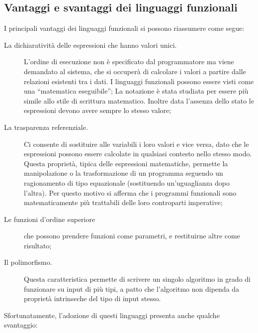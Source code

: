 \subsection{Vantaggi e svantaggi dei linguaggi 
funzionali}
I principali vantaggi dei linguaggi funzionali si possono riassumere come segue:
\begin{description}
    \item[La dichiarativit\`a delle espressioni che hanno valori 
    unici.] L'ordine di esecuzione non \`e specificato dal programmatore ma 
    viene demandato al sistema, che si occuper\`a di calcolare i valori a 
    partire dalle relazioni esistenti tra i dati. I linguaggi funzionali 
    possono essere visti come una ``matematica eseguibile''; La notazione \`e
    stata studiata per essere pi\`u simile allo stile di scrittura 
    matematico. Inoltre data l'assenza dello stato le espressioni devono avere sempre lo stesso valore;

    \item[La trasparenza referenziale.] Ci consente di sostituire alle 
    variabili i loro valori e vice versa, dato che le espressioni possono 
    essere calcolate in qualsiasi contesto nello stesso modo. Questa propriet\`a, tipica delle 
    espressioni matematiche, permette la manipolazione o la trasformazione di 
    un programma seguendo un ragionamento di tipo equazionale (sostituendo un'uguaglianza 
    dopo l'altra). Per questo motivo si afferma che i programmi funzionali 
    sono matematicamente pi\`u trattabili delle loro controparti imperative;

    \item[Le funzioni d'ordine superiore] che possono prendere funzioni come parametri, e restituirne altre come risultato;

    \item[Il polimorfismo.] Questa caratteristica permette di scrivere un singolo algoritmo 
    in grado di funzionare su input di pi\`u tipi, a patto che l'algoritmo non 
    dipenda da propriet\`a intrinseche del tipo di input stesso.

\end{description}
Sfortunatamente, l'adozione di questi linguaggi presenta anche qualche 
svantaggio:
